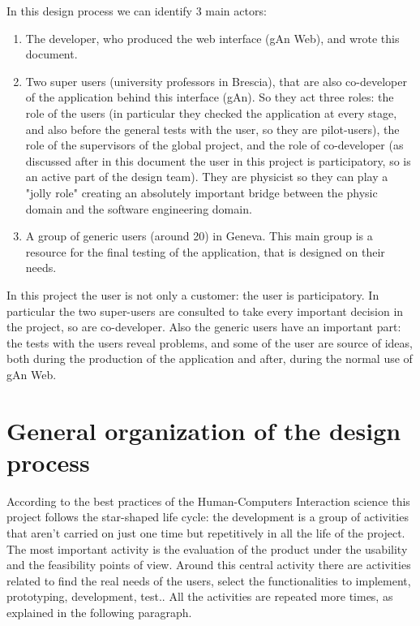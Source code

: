 In this design process we can identify 3 main actors: 
\begin{enumerate}

\item
The developer, who produced the web interface (gAn Web), and wrote this document.

\item 
Two super users (university professors in Brescia), that are also co-developer of the application behind this interface (gAn). So they act three roles: the role of the users (in particular they checked the application at every stage, and also before the general tests with the user, so they are pilot-users), the role of the supervisors of the global project, and the role of co-developer (as discussed after in this document the user in this project is participatory, so is an active part of the design team). 
They are physicist so they can play a "jolly role" creating an absolutely important bridge between the physic domain and the software engineering domain. 

\item A group of generic users (around 20) in Geneva. This main group is a resource for the final testing of the application, that is designed on their needs.
 
\end{enumerate}

In this project the user is not only a customer: the user is participatory. In particular the two super-users are consulted to take every important decision in the project, so are co-developer. Also the generic users have an important part: the tests with the users reveal problems, and some of the user are source of ideas, both during the production of the application and after, during the normal use of gAn Web.

\section{General organization of the design process }
According to the best practices of the Human-Computers Interaction science this project follows the star-shaped life cycle: the development is a group of activities that aren't carried on just one time but repetitively in all the life of the project. The most important activity is the evaluation of the product under the usability and the feasibility points of view. Around this central activity there are activities related to find the real needs of the users, select the functionalities to implement, prototyping, development, test.. All the activities are repeated more times, as explained in the following paragraph.    

